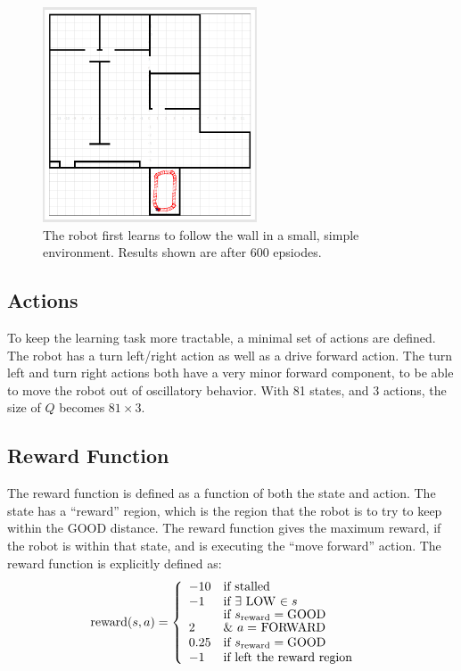 \documentclass[letterpaper, 10 pt, conference]{ieeeconf}  %
\begin{document}
\begin{figure}
\centering
\includegraphics[width=2.5in]{stage-in-smallroom.png}
\caption{The robot first learns to follow the wall in a small, simple environment.
Results shown are after 600 epsiodes.}
\label{fig:smallroom}
\end{figure}


\subsection{Actions}
To keep the learning task more tractable, a minimal set of actions are defined. 
The robot has a turn left/right action as well as a drive forward action. 
The turn left and turn right actions both have a very minor forward component, to be able to move the robot out of oscillatory behavior. 
With 81 states, and 3 actions, the size of $Q$ becomes $81\times3$. 
\subsection{Reward Function}
The reward function is defined as a function of both the state and action. 
The state has a ``reward'' region, which is the region that the robot is to try to keep within the GOOD distance. 
The reward function gives the maximum reward, if the robot is within that state, and is executing the ``move forward'' action. 
The reward function is explicitly defined as: 
\begin{align}
\text{reward}(s,a) &= \left\{ \begin{array}{ll}
-10 & \mbox{if stalled} \\
-1 & \mbox{if $\exists$ LOW $\in s$} \\
 2 & \vbox{\hbox{if $s_{\text{reward}} = \text{GOOD}$}
 			\vspace{2pt}
              \hbox{\& $a = $ FORWARD}}  \\
 0.25 & \mbox{if $s_{\text{reward}} = \text{GOOD}$} \\
 -1 & \mbox{if left the reward region}
\end{array}
\right.
\end{align}
\end{document}
